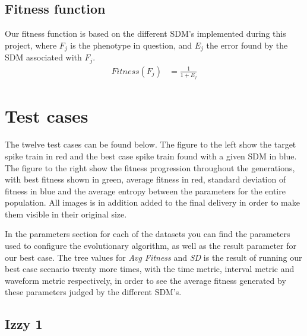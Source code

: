 \documentclass[10pt]{article}
\begin{document}
	\subsection{Fitness function}\label{sec:fitness}
		Our fitness function is based on the different SDM's implemented during this project, where $F_j$ is the phenotype in question, and $E_j$ the error found by the SDM associated with $F_j$.
		\begin{align}
			Fitness(F_j) &= \frac{1}{1+E_j}\nonumber
		\end{align}
\section{Test cases}\label{sec:test}
	The twelve test cases can be found below. The figure to the left show the target spike train in red and the best case spike train found with a given SDM in blue. The figure to the right show the fitness progression throughout the generations, with best fitness shown in green, average fitness in red, standard deviation of fitness in blue and the average entropy between the parameters for the entire population. All images is in addition added to the final delivery in order to make them visible in their original size. 
	
	In the parameters section for each of the datasets you can find the parameters used to configure the evolutionary algorithm, as well as the result parameter for our best case. The tree values for \textit{Avg Fitness} and \textit{SD} is the result of running our best case scenario twenty more times, with the time metric, interval metric and waveform metric respectively,  in order to see the average fitness generated by these parameters judged by the different SDM's.
	\subsection{Izzy 1}
\end{document}
